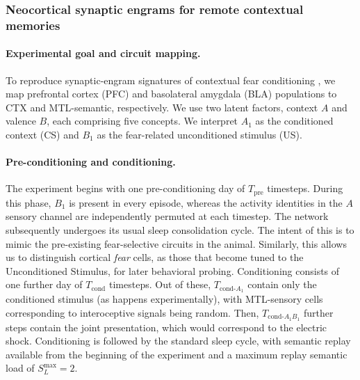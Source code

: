 \documentclass{article}
\begin{document}
\subsubsection*{Neocortical synaptic engrams for remote contextual memories }

\paragraph{Experimental goal and circuit mapping.}
To reproduce synaptic-engram signatures of contextual fear conditioning , we map prefrontal cortex (PFC) and basolateral amygdala (BLA) populations to CTX and MTL-semantic, respectively. We use two latent factors, context $A$ and valence $B$, each comprising five concepts. We interpret $A_1$ as the conditioned context (CS) and $B_1$ as the fear-related unconditioned stimulus (US).
\newline\newline
\paragraph{Pre-conditioning and conditioning.}
The experiment begins with one pre-conditioning day of $T_{\textrm{pre}}$ timesteps. During this phase, $B_1$ is present in every episode, whereas the activity identities in the $A$ sensory channel are independently permuted at each timestep. The network subsequently undergoes its usual sleep consolidation cycle. The intent of this is to mimic the pre-existing fear-selective circuits in the animal. Similarly, this allows us to distinguish cortical \textit{fear} cells, as those that become tuned to the Unconditioned Stimulus, for later behavioral probing.
\newline\newline
Conditioning consists of one further day of $T_{\textrm{cond}}$ timesteps. Out of these, $T_{\textrm{cond-}A_1}$ contain only the conditioned stimulus (as happens experimentally), with MTL-sensory cells corresponding to interoceptive signals being random. Then, $T_{\textrm{cond-}A_1B_1}$ further steps contain the joint presentation, which would correspond to the electric shock. Conditioning is followed by the standard sleep cycle, with semantic replay available from the beginning of the experiment and a maximum replay semantic load of $S_L^{\max}=2$.
\end{document}
